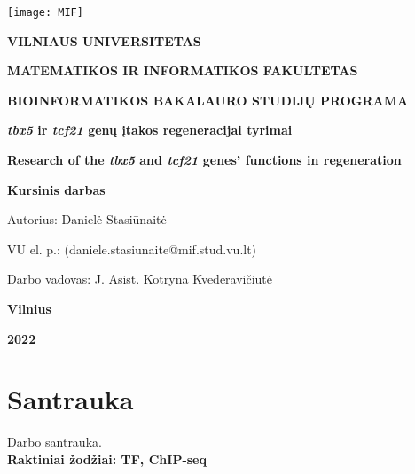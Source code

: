 \documentclass[11pt]{article}
\begin{document}

\begin{titlepage}
\vskip 20pt
\begin{center}
\texttt{[image: MIF]}
\end{center}


\vskip 20pt
\centerline{\bf \large \textbf{VILNIAUS UNIVERSITETAS}}
\bigskip
\centerline{\large \textbf{MATEMATIKOS IR INFORMATIKOS FAKULTETAS}}
\bigskip
\centerline{\large \textbf{BIOINFORMATIKOS BAKALAURO STUDIJŲ PROGRAMA}}

\vskip 90pt
\begin{center}
    {\bf \LARGE \emph{tbx5} ir \emph{tcf21} genų įtakos regeneracijai tyrimai}
\end{center}
\begin{center}
    {\bf \Large Research of the \emph{tbx5} and \emph{tcf21} genes' functions in regeneration}
\end{center}
\vskip 20pt
\centerline{\bf \Large \textbf{Kursinis darbas}}
\bigskip
\vskip 50pt

\hskip 140pt {\Large Autorius: Danielė Stasiūnaitė}

\hskip 140pt{\Large VU el. p.: (daniele.stasiunaite@mif.stud.vu.lt)}
\bigskip
\vskip 20pt

\hskip 140pt {\Large Darbo vadovas: J. Asist. Kotryna Kvederavičiūtė}
\vskip 60pt
\vskip 60pt
\centerline{\large \textbf{Vilnius}}
\centerline{\large \textbf{2022}}
\newpage
\end{titlepage}


\tableofcontents
\newpage

\section*{Santrauka}
Darbo santrauka.\\

\textbf{Raktiniai žodžiai: TF, ChIP-seq}
\newpage

\end{document}
